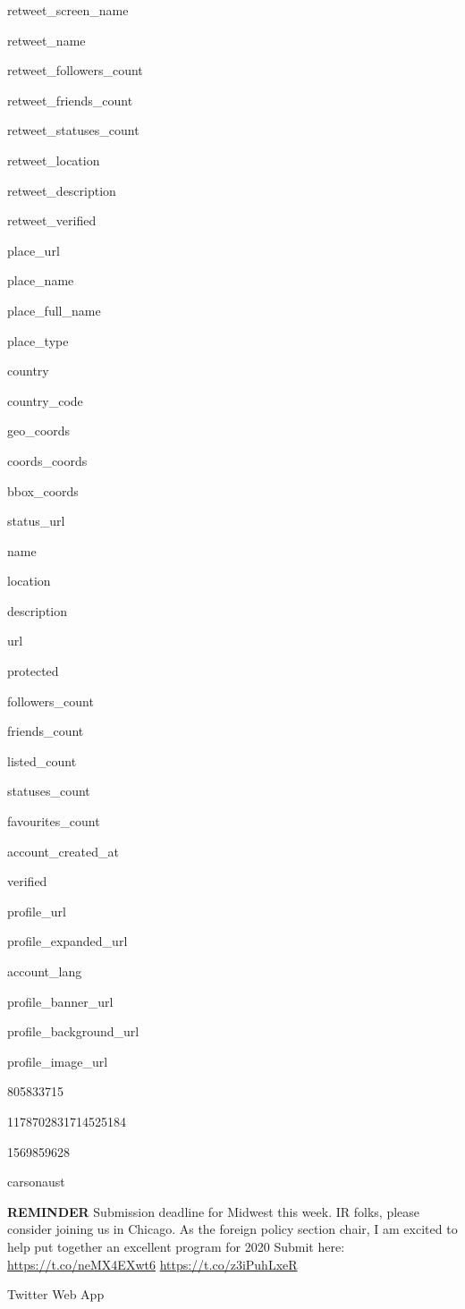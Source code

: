 \documentclass[]{book}
\begin{document}
retweet\_screen\_name

retweet\_name

retweet\_followers\_count

retweet\_friends\_count

retweet\_statuses\_count

retweet\_location

retweet\_description

retweet\_verified

place\_url

place\_name

place\_full\_name

place\_type

country

country\_code

geo\_coords

coords\_coords

bbox\_coords

status\_url

name

location

description

url

protected

followers\_count

friends\_count

listed\_count

statuses\_count

favourites\_count

account\_created\_at

verified

profile\_url

profile\_expanded\_url

account\_lang

profile\_banner\_url

profile\_background\_url

profile\_image\_url

805833715

1178702831714525184

1569859628

carsonaust

\textbf{REMINDER} Submission deadline for Midwest this week. IR folks,
please consider joining us in Chicago. As the foreign policy section
chair, I am excited to help put together an excellent program for 2020
Submit here: \url{https://t.co/neMX4EXwt6} \url{https://t.co/z3iPuhLxeR}

Twitter Web App
\end{document}
